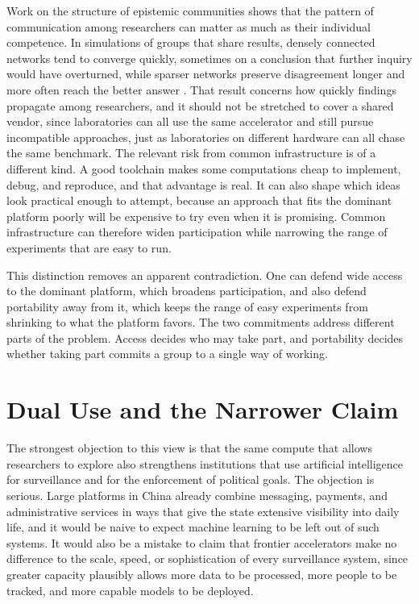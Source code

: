 \documentclass[12pt]{article}
\begin{document}
Work on the structure of epistemic communities shows that the pattern of communication among researchers can matter as much as their individual competence. In simulations of groups that share results, densely connected networks tend to converge quickly, sometimes on a conclusion that further inquiry would have overturned, while sparser networks preserve disagreement longer and more often reach the better answer \cite{zollman2007}. That result concerns how quickly findings propagate among researchers, and it should not be stretched to cover a shared vendor, since laboratories can all use the same accelerator and still pursue incompatible approaches, just as laboratories on different hardware can all chase the same benchmark. The relevant risk from common infrastructure is of a different kind. A good toolchain makes some computations cheap to implement, debug, and reproduce, and that advantage is real. It can also shape which ideas look practical enough to attempt, because an approach that fits the dominant platform poorly will be expensive to try even when it is promising. Common infrastructure can therefore widen participation while narrowing the range of experiments that are easy to run.

This distinction removes an apparent contradiction. One can defend wide access to the dominant platform, which broadens participation, and also defend portability away from it, which keeps the range of easy experiments from shrinking to what the platform favors. The two commitments address different parts of the problem. Access decides who may take part, and portability decides whether taking part commits a group to a single way of working.

\section{Dual Use and the Narrower Claim}

The strongest objection to this view is that the same compute that allows researchers to explore also strengthens institutions that use artificial intelligence for surveillance and for the enforcement of political goals. The objection is serious. Large platforms in China already combine messaging, payments, and administrative services in ways that give the state extensive visibility into daily life, and it would be naive to expect machine learning to be left out of such systems. It would also be a mistake to claim that frontier accelerators make no difference to the scale, speed, or sophistication of every surveillance system, since greater capacity plausibly allows more data to be processed, more people to be tracked, and more capable models to be deployed.
\end{document}
